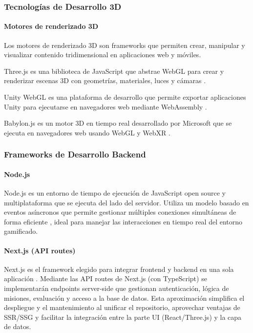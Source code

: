 \subsubsection{Tecnologías de Desarrollo 3D}

\paragraph{Motores de renderizado 3D}
Los motores de renderizado 3D son frameworks que permiten crear, manipular y visualizar contenido tridimensional en aplicaciones web y móviles.

Three.js es una biblioteca de JavaScript que abstrae WebGL para crear y renderizar escenas 3D con geometrías, materiales, luces y cámaras \cite{threejs2023}.

Unity WebGL es una plataforma de desarrollo que permite exportar aplicaciones Unity para ejecutarse en navegadores web mediante WebAssembly \cite{unity2023}.

Babylon.js es un motor 3D en tiempo real desarrollado por Microsoft que se ejecuta en navegadores web usando WebGL y WebXR \cite{microsoft2023}.

\subsubsection{Frameworks de Desarrollo Backend}

\paragraph{Node.js}
Node.js es un entorno de tiempo de ejecución de JavaScript open source y multiplataforma que se ejecuta del lado del servidor. Utiliza un modelo basado en eventos asíncronos que permite gestionar múltiples conexiones simultáneas de forma eficiente \cite{acibeiro2022}, ideal para manejar las interacciones en tiempo real del entorno gamificado.

\paragraph{Next.js (API routes)}
Next.js es el framework elegido para integrar frontend y backend en una sola aplicación \cite{nextjs_docs2024}. Mediante las API routes de Next.js (con TypeScript) se implementarán endpoints server-side que gestionan autenticación, lógica de misiones, evaluación y acceso a la base de datos. Esta aproximación simplifica el despliegue y el mantenimiento al unificar el repositorio, aprovechar ventajas de SSR/SSG y facilitar la integración entre la parte UI (React/Three.js) y la capa de datos.

